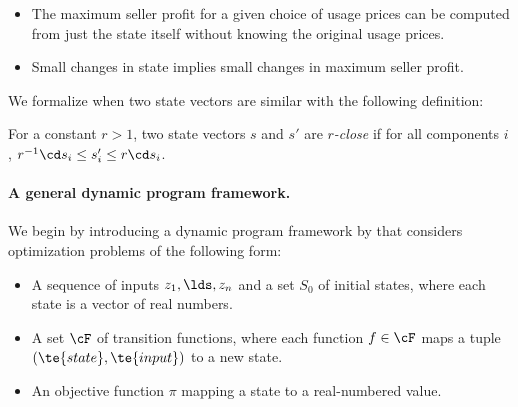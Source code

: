 \begin{itemize}
    \item The maximum seller profit for a given choice of usage prices can be computed from just the state itself without knowing the original usage prices.
    \item Small changes in state implies small changes in maximum seller profit.
\end{itemize} 

We formalize when two state vectors are similar with the following definition:

\begin{definition*}
    For a constant $r>1$, two state vectors $s$ and $s'$ are \emph{$r$-close} if for all components $i$, $r^{-1} \cd s_i \le s'_i \le r\cd s_i$.
\end{definition*}


\paragraph{A general dynamic program framework.}

We begin by introducing a dynamic program framework by \citet{woeginger2000} that considers optimization problems of the following form:

\begin{itemize}
    \item A sequence of inputs $z_1,\lds,z_n$ and a set $S_0$ of initial states, where each state is a vector of real numbers.
    \item A set $\cF$ of transition functions, where each function $f\in \cF$ maps a tuple $(\te{state}, \te{input})$ to a new state.
    \item An objective function $\pi$ mapping a state to a real-numbered value.
\end{itemize}

